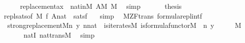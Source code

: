 \begin{isabellebody}
\ \ \ \ \isamarkupfalse%
\ replacement{\isacharunderscore}{\kern0pt}ax\ {}\ nat{\isacharunderscore}{\kern0pt}in{\isacharunderscore}{\kern0pt}M\ {\isacartoucheopen}A{\isasymin}M{\isacartoucheclose}\ {\isacartoucheopen}{}{\isasymin}M{\isacartoucheclose}\ \isamarkupfalse%
\ simp\isanewline
\ \ \isamarkupfalse%
\isanewline
\ \ \isamarkupfalse%
\ {\isacharquery}{\kern0pt}thesis\ \isamarkupfalse%
\ repl{\isacharunderscore}{\kern0pt}sats{\isacharbrackleft}{\kern0pt}of\ M\ {\isacharquery}{\kern0pt}f\ {\isachardoublequoteopen}{\isacharbrackleft}{\kern0pt}A{\isacharcomma}{\kern0pt}{}{\isacharcomma}{\kern0pt}nat{\isacharbrackright}{\kern0pt}{\isachardoublequoteclose}{\isacharbrackright}{\kern0pt}\ \ satsf\ \ \isamarkupfalse%
\ simp\isanewline
{}\isamarkupfalse%
%
\endisatagproof
{\isafoldproof}%
%
\isadelimproof
\isanewline
%
\endisadelimproof
\isanewline
{}\isamarkupfalse%
\ {\isacharparenleft}{\kern0pt}\ M{\isacharunderscore}{\kern0pt}ZF{\isacharunderscore}{\kern0pt}trans{\isacharparenright}{\kern0pt}\ formula{\isacharunderscore}{\kern0pt}repl{}{\isacharunderscore}{\kern0pt}intf{\isacharcolon}{\kern0pt}\isanewline
\ \ {\isachardoublequoteopen}strong{\isacharunderscore}{\kern0pt}replacement{\isacharparenleft}{\kern0pt}{\isacharhash}{\kern0pt}{\isacharhash}{\kern0pt}M{\isacharcomma}{\kern0pt}{\isasymlambda}n\ y{\isachardot}{\kern0pt}\ n{\isasymin}nat\ {\isacharampersand}{\kern0pt}\ is{\isacharunderscore}{\kern0pt}iterates{\isacharparenleft}{\kern0pt}{\isacharhash}{\kern0pt}{\isacharhash}{\kern0pt}M{\isacharcomma}{\kern0pt}\ is{\isacharunderscore}{\kern0pt}formula{\isacharunderscore}{\kern0pt}functor{\isacharparenleft}{\kern0pt}{\isacharhash}{\kern0pt}{\isacharhash}{\kern0pt}M{\isacharparenright}{\kern0pt}{\isacharcomma}{\kern0pt}\ {}{\isacharcomma}{\kern0pt}\ n{\isacharcomma}{\kern0pt}\ y{\isacharparenright}{\kern0pt}{\isacharparenright}{\kern0pt}{\isachardoublequoteclose}\isanewline
%
\isadelimproof
%
\endisadelimproof
%
\isatagproof
{}\isamarkupfalse%
\ {\isacharminus}{\kern0pt}\isanewline
\ \ \isamarkupfalse%
\ {\isachardoublequoteopen}{}{\isasymin}M{\isachardoublequoteclose}\isanewline
\ \ \ \ \isamarkupfalse%
\ \ nat{\isacharunderscore}{\kern0pt}{}I\ nat{\isacharunderscore}{\kern0pt}trans{\isacharunderscore}{\kern0pt}M\ \isamarkupfalse%
\ simp\isanewline
\ \ \isamarkupfalse%

\end{isabellebody}
